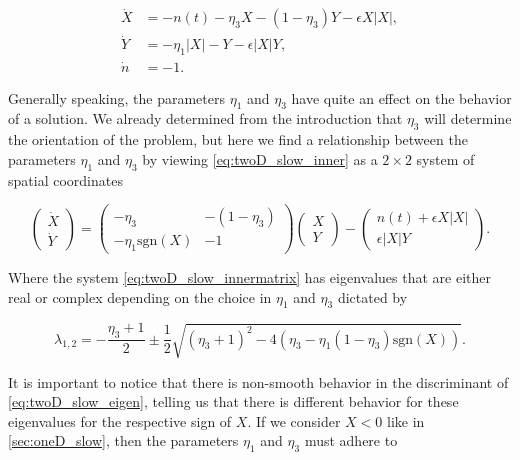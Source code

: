 \begin{equation}\label{eq:twoD_slow_inner}
\begin{aligned}
   \dot{X} & =  -n(t)-\eta_3 X-(1-\eta_3)Y-\epsilon X|X|, \\
   \dot{Y} & =  -\eta_1 |X|-Y-\epsilon |X|Y,  \\
  \dot{n}  & =  -1.
  \end{aligned}
\end{equation}

Generally speaking, the parameters $\eta_1$ and $\eta_3$ have quite an effect on the behavior of a solution. We already determined from the introduction that $\eta_3$ will determine the orientation of the problem, but here we find a relationship between the parameters $\eta_1$ and $\eta_3$ by viewing \eqref{eq:twoD_slow_inner} as a $2\times 2$ system of spatial coordinates

\begin{equation}\label{eq:twoD_slow_innermatrix}
\begin{pmatrix}
\dot{X}\\
\dot{Y}
\end{pmatrix}=
\begin{pmatrix}
-\eta_3 & -(1-\eta_3) \\ 
-\eta_1\text{sgn}(X) & -1
\end{pmatrix}
\begin{pmatrix}
X\\
Y
\end{pmatrix}-
\begin{pmatrix}
n(t)+\epsilon X|X|\\
\epsilon |X|Y
\end{pmatrix}.
\end{equation}

Where the system \eqref{eq:twoD_slow_innermatrix} has eigenvalues that are either real or complex depending on the choice in $\eta_1$ and $\eta_3$ dictated by

\begin{equation}\label{eq:twoD_slow_eigen}
\lambda_{1,2} = -\frac{\eta_3+1}{2}\pm \frac{1}{2}\sqrt{(\eta_3+1)^2-4(\eta_3-\eta_1(1-\eta_3)\text{sgn}(X))}.
\end{equation}

It is important to notice that there is non-smooth behavior in the discriminant of \eqref{eq:twoD_slow_eigen}, telling us that there is different behavior for these eigenvalues for the respective sign of $X$. If we consider $X<0$ like in \autoref{sec:oneD_slow}, then the parameters $\eta_1$ and $\eta_3$ must adhere to

